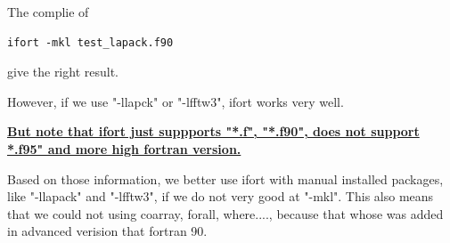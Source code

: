The complie of 
\begin{verbatim}
ifort -mkl test_lapack.f90 
\end{verbatim}
give the right result.

However, if we use "-llapck" or "-lfftw3", ifort works very well. 

\underline{\textbf{But note that ifort  just suppports "*.f", "*.f90", does not support *.f95" and more high fortran version.}}

Based on those information, we better use ifort with manual installed packages, like "-llapack" and "-lfftw3", if we do not very good at "-mkl". This also means that we could not using coarray, forall, where...., because that whose was added in advanced verision that fortran 90.
 
 
